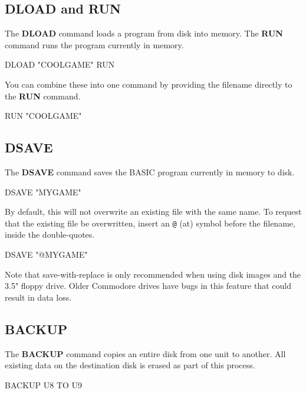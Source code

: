 \subsection{DLOAD and RUN}

The {\bf DLOAD} command loads a program from disk into memory. The {\bf RUN} command runs the program currently in memory.

\begin{screenoutput}
DLOAD "COOLGAME"
RUN
\end{screenoutput}

You can combine these into one command by providing the filename directly to the {\bf RUN} command.

\begin{screenoutput}
RUN "COOLGAME"
\end{screenoutput}

\subsection{DSAVE}

The {\bf DSAVE} command saves the BASIC program currently in memory to disk.

\begin{screenoutput}
DSAVE "MYGAME"
\end{screenoutput}

By default, this will not overwrite an existing file with the same name. To request that the existing file be overwritten, insert an {\tt @} (at) symbol before the filename, inside the double-quotes.

\begin{screenoutput}
DSAVE "@MYGAME"
\end{screenoutput}

Note that save-with-replace is only recommended when using disk images and the 3.5" floppy drive. Older Commodore drives have bugs in this feature that could result in data loss.

\subsection{BACKUP}

The {\bf BACKUP} command copies an entire disk from one unit to another. All existing data on the destination disk is erased as part of this process.

\begin{screenoutput}
BACKUP U8 TO U9
\end{screenoutput}

